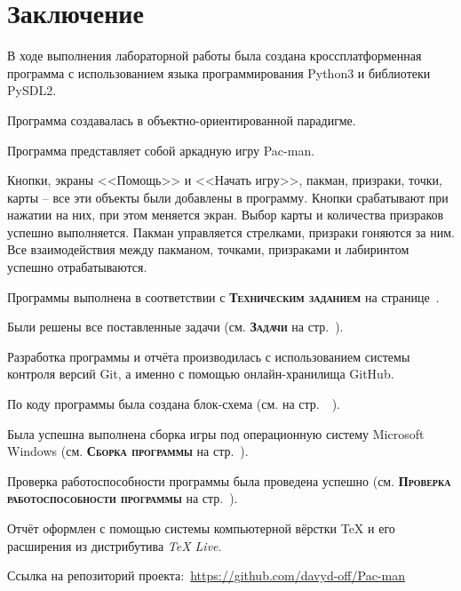 \documentclass[14pt, oneside]{altsu-report}
\begin{document}

 

\chapter*{Заключение}
В ходе выполнения лабораторной работы была создана кроссплатформенная программа с использованием языка программирования Python3 и библиотеки PySDL2.

Программа создавалась в объектно-ориентированной парадигме.

Программа представляет собой аркадную игру Pac-man.

Кнопки, экраны <<Помощь>> и <<Начать игру>>, пакман, призраки, точки, карты -- все эти объекты были добавлены в программу. Кнопки срабатывают при нажатии на них, при этом меняется экран. Выбор карты и количества призраков успешно выполняется. Пакман управляется стрелками, призраки гоняются за ним. Все взаимодействия между пакманом, точками, призраками и лабиринтом успешно отрабатываются. 

Программы выполнена в соответствии с \textbf{\textsc{Техническим заданием}} на странице~\pageref{sec:ch01/sec01}.

Были решены все поставленные задачи (см. \textbf{\textsc{Задачи}} на стр.~\pageref{zadachi}).

Разработка программы и отчёта производилась с использованием системы контроля версий Git, а именно с помощью онлайн-хранилища GitHub.

По коду программы была создана блок-схема (см. на стр.~\pageref{fig7}~\pageref{fig8}).

Была успешна выполнена сборка игры под операционную систему Microsoft Windows (см. \textbf{\textsc{Сборка программы}} на стр.~\pageref{sec:ch02/sec01/sub09}).

Проверка работоспособности программы была проведена успешно (см. \textbf{\textsc{Проверка работоспособности программы}} на стр.~\pageref{sec:ch02/sec01/sub10}).

Отчёт оформлен с помощью системы компьютерной вёрстки \TeX{} и его расширения \XeTeX{} из дистрибутива \textit{TeX Live}.

Ссылка на репозиторий проекта:~\textcolor{blue}{\url{https://github.com/davyd-off/Pac-man}}

\newpage
{}
\printbibliography[title={Список использованной литературы}]
\end{document}
